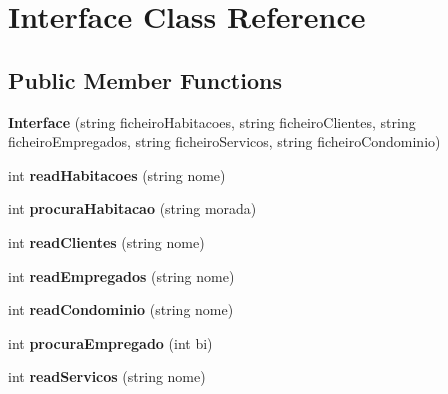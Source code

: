 \hypertarget{class_interface}{}\section{Interface Class Reference}
\label{class_interface}
\subsection*{Public Member Functions}
\begin{DoxyCompactItemize}
\item 
{\bfseries Interface} (string ficheiro\+Habitacoes, string ficheiro\+Clientes, string ficheiro\+Empregados, string ficheiro\+Servicos, string ficheiro\+Condominio)\hypertarget{class_interface_a4c177919e79ec95562a389e522f4600e}{}\label{class_interface_a4c177919e79ec95562a389e522f4600e}

\item 
int {\bfseries read\+Habitacoes} (string nome)\hypertarget{class_interface_a3c605f4160106a724be0fce9efe3bc92}{}\label{class_interface_a3c605f4160106a724be0fce9efe3bc92}

\item 
int {\bfseries procura\+Habitacao} (string morada)\hypertarget{class_interface_ac6040bbfe9d93dbe66073486895b350f}{}\label{class_interface_ac6040bbfe9d93dbe66073486895b350f}

\item 
int {\bfseries read\+Clientes} (string nome)\hypertarget{class_interface_acd189be806d0b10c88172c9ef7690516}{}\label{class_interface_acd189be806d0b10c88172c9ef7690516}

\item 
int {\bfseries read\+Empregados} (string nome)\hypertarget{class_interface_ad9610b10ebc19be8d43d9e3fcf73cb13}{}\label{class_interface_ad9610b10ebc19be8d43d9e3fcf73cb13}

\item 
int {\bfseries read\+Condominio} (string nome)\hypertarget{class_interface_a33674b11f816b6614f9e5c69d346c706}{}\label{class_interface_a33674b11f816b6614f9e5c69d346c706}

\item 
int {\bfseries procura\+Empregado} (int bi)\hypertarget{class_interface_a3f5893a482f5a1b2161dfcea02b79746}{}\label{class_interface_a3f5893a482f5a1b2161dfcea02b79746}

\item 
int {\bfseries read\+Servicos} (string nome)\hypertarget{class_interface_ad59e6bc08a709c085139c660bbb90429}{}\label{class_interface_ad59e6bc08a709c085139c660bbb90429}


\end{DoxyCompactItemize}
